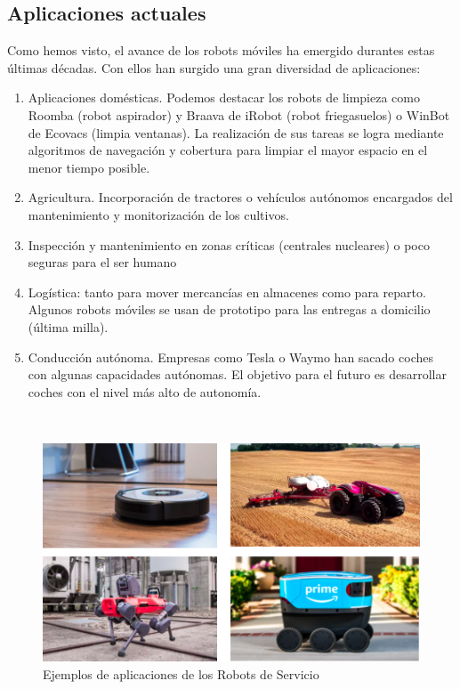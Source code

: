 \subsection{Aplicaciones actuales}
\label{subsec:aplicaciones_actuales}
Como hemos visto, el avance de los robots móviles ha emergido durantes estas últimas décadas. Con ellos han surgido una gran diversidad de aplicaciones:

\begin{enumerate}
	\item Aplicaciones domésticas. Podemos destacar los robots de limpieza como Roomba (robot aspirador) y Braava de iRobot (robot friegasuelos) o WinBot de Ecovacs (limpia ventanas). La realización de sus tareas se logra mediante algoritmos de navegación y cobertura para limpiar el mayor espacio en el menor tiempo posible.
	\item Agricultura. Incorporación de tractores o vehículos autónomos encargados del mantenimiento y monitorización de los cultivos.
	\item Inspección y mantenimiento en zonas críticas (centrales nucleares) o poco seguras para el ser humano
	\item Logística: tanto para mover mercancías en almacenes como para reparto. Algunos robots móviles se usan de prototipo para las entregas a domicilio (última milla).
	\item Conducción autónoma. Empresas como Tesla o Waymo han sacado coches con algunas capacidades autónomas. El objetivo para el futuro es desarrollar coches con el nivel más alto de autonomía.
\end{enumerate}\

\begin{figure}[H]
  \begin{center}
    \includegraphics[width=15cm]{imagenes/cap1/aplicaciones.png}
  \end{center}
  \caption[Ejemplos de aplicaciones de los Robots de Servicio]{Ejemplos de aplicaciones de los Robots de Servicio}
  \label{fig:neurona}
\end{figure}\



